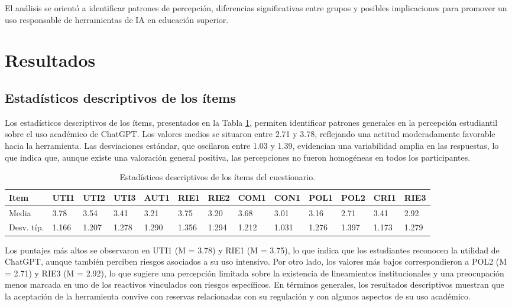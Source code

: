 \documentclass[spanish]{textolivre}
\begin{document}
    

El análisis se orientó a identificar patrones de percepción, diferencias significativas entre grupos y posibles implicaciones para promover un uso responsable de herramientas de IA en educación superior.

\section{Resultados}
\subsection{Estadísticos descriptivos de los ítems}

Los estadísticos descriptivos de los ítems, presentados en la Tabla \ref{tab1}, permiten identificar patrones generales en la percepción estudiantil sobre el uso académico de ChatGPT. Los valores medios se situaron entre 2.71 y 3.78, reflejando una actitud moderadamente favorable hacia la herramienta. Las desviaciones estándar, que oscilaron entre 1.03 y 1.39, evidencian una variabilidad amplia en las respuestas, lo que indica que, aunque existe una valoración general positiva, las percepciones no fueron homogéneas en todos los participantes.


\begin{table}[htbp]
\centering
\begin{threeparttable}
\caption{Estadísticos descriptivos de los ítems del cuestionario.}
\label{tab1}
\begin{tabular}{p{1cm} p{0.7cm} p{0.7cm} p{0.7cm} p{0.7cm} p{0.7cm} p{0.7cm} p{0.7cm} p{0.7cm} p{0.7cm} p{0.7cm} p{0.7cm} p{0.7cm}}
\toprule
Item & UTI1 & UTI2 & UTI3 & AUT1 & RIE1 & RIE2 & COM1 & CON1 & POL1 & POL2 & CRI1 & RIE3 \\ \midrule
Media & 3.78 & 3.54 & 3.41 & 3.21 & 3.75 & 3.20 & 3.68 & 3.01 & 3.16 & 2.71 & 3.41 & 2.92 \\
Desv. típ. & 1.166 & 1.207 & 1.278 & 1.290 & 1.356 & 1.294 & 1.212 & 1.031 & 1.276 & 1.397 & 1.173 & 1.279 \\ \bottomrule
\end{tabular}
\end{threeparttable}
\end{table}

Los puntajes más altos se observaron en UTI1 (M = 3.78) y RIE1 (M = 3.75), lo que indica que los estudiantes reconocen la utilidad de ChatGPT, aunque también perciben riesgos asociados a su uso intensivo. Por otro lado, los valores más bajos correspondieron a POL2 (M = 2.71) y RIE3 (M = 2.92), lo que sugiere una percepción limitada sobre la existencia de lineamientos institucionales y una preocupación menos marcada en uno de los reactivos vinculados con riesgos específicos. En términos generales, los resultados descriptivos muestran que la aceptación de la herramienta convive con reservas relacionadas con su regulación y con algunos aspectos de su uso académico.
\end{document}
